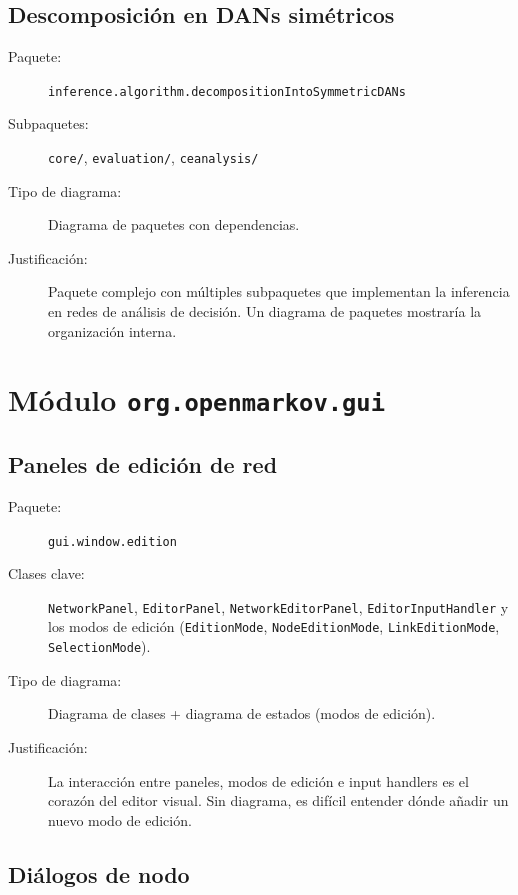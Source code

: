 \documentclass[11pt,a4paper]{article}
\newcommand{\code}[1]{\texttt{#1}}
\newcommand{\pkg}[1]{\texttt{\small #1}}
\begin{document}
\subsection{Descomposici\'on en DANs sim\'etricos}

\begin{description}
  \item[Paquete:] \pkg{inference.algorithm.decompositionIntoSymmetricDANs}
  \item[Subpaquetes:] \code{core/}, \code{evaluation/},
        \code{ceanalysis/}
  \item[Tipo de diagrama:] Diagrama de paquetes con dependencias.
  \item[Justificaci\'on:] Paquete complejo con m\'ultiples subpaquetes
        que implementan la inferencia en redes de an\'alisis de
        decisi\'on.  Un diagrama de paquetes mostrar\'ia la
        organizaci\'on interna.
\end{description}

\section{M\'odulo \code{org.openmarkov.gui}}

\subsection{Paneles de edici\'on de red}

\begin{description}
  \item[Paquete:] \pkg{gui.window.edition}
  \item[Clases clave:] \code{NetworkPanel},
        \code{EditorPanel}, \code{NetworkEditorPanel},
        \code{EditorInputHandler} y los modos de edici\'on
        (\code{EditionMode}, \code{NodeEditionMode},
        \code{LinkEditionMode}, \code{SelectionMode}).
  \item[Tipo de diagrama:] Diagrama de clases + diagrama de estados
        (modos de edici\'on).
  \item[Justificaci\'on:] La interacci\'on entre paneles, modos de
        edici\'on e input handlers es el coraz\'on del editor visual.
        Sin diagrama, es dif\'icil entender d\'onde a\~nadir un nuevo
        modo de edici\'on.
\end{description}

\subsection{Di\'alogos de nodo}
\end{document}
